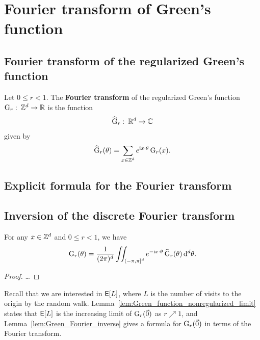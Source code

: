 \chapter{Fourier transform of Green's function}

\section{Fourier transform of the regularized Green's function}

\begin{definition}
  \label{def:Green_Fourier_transf}
  Let $0 \le r < 1$.
  The \textbf{Fourier transform} of the regularized Green's function
  $\mathrm{G}_{r} \, \colon \, \mathbb{Z}^d \to \mathbb{R}$
  is the function
  \begin{align*}
  \widehat{\mathrm{G}}_{r} \, \colon \, \mathbb{R}^d \to \mathbb{C}
  \end{align*}
  given by
  \begin{align*}
  \widehat{\mathrm{G}}_{r} (\theta) = \sum_{x \in \mathbb{Z}^d} e^{\mathrm{i} x \cdot \theta} \, \mathrm{G}_{r}(x) .
  \end{align*}
\end{definition}

\section{Explicit formula for the Fourier transform}

\section{Inversion of the discrete Fourier transform}

\begin{lemma}
  \label{lem:Green_Fourier_inverse}
  For any $x \in \mathbb{Z}^d$ and $0 \le r < 1$, we have
  \begin{align*}
  \mathrm{G}_{r} (\theta)
  = \frac{1}{(2\pi)^d} \iint_{(-\pi,\pi]^d} e^{-\mathrm{i} x \cdot \theta} \, \widehat{\mathrm{G}}_{r} (\theta) \, \mathrm{d}^d \theta .
  \end{align*}
\end{lemma}
\begin{proof}
\ldots
\end{proof}

Recall that we are interested in $\mathsf{E}[L]$, where $L$ is the number of visits to the
origin by the random walk. Lemma~\ref{lem:Green_function_nonregularized_limit}
states that $\mathsf{E}[L]$ is the increasing limit of $\mathrm{G}_{r}(\vec{0})$ as $r \nearrow 1$,
and Lemma~\ref{lem:Green_Fourier_inverse} gives a formula for $\mathrm{G}_{r}(\vec{0})$
in terms of the Fourier transform.

